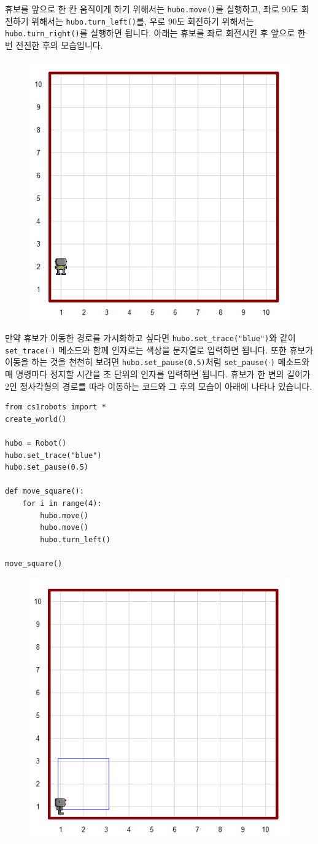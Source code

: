 \documentclass[../main.tex]{subfiles}
\begin{document}
휴보를 앞으로 한 칸 움직이게 하기 위해서는 \texttt{hubo.move()}를 실행하고, 좌로 90도 회전하기 위해서는 \texttt{hubo.turn\_left()}를, 우로 90도 회전하기 위해서는 \texttt{hubo.turn\_right()}를 실행하면 됩니다.
아래는 휴보를 좌로 회전시킨 후 앞으로 한 번 전진한 후의 모습입니다.
\begin{figure}[H]
\centering
\includegraphics[width=0.5\linewidth]{"./lectures/lecture4_huboleftmove"}
\label{fig:lecture4huboleftmove}
\end{figure}

만약 휴보가 이동한 경로를 가시화하고 싶다면 \texttt{hubo.set\_trace("blue")}와 같이 \texttt{set\_trace($\cdot$)} 메소드와 함께 인자로는 색상을 문자열로 입력하면 됩니다.
또한 휴보가 이동을 하는 것을 천천히 보려면 \texttt{hubo.set\_pause(0.5)}처럼 \texttt{set\_pause($\cdot$)} 메소드와 매 명령마다 정지할 시간을 초 단위의 인자를 입력하면 됩니다.
휴보가 한 변의 길이가 2인 정사각형의 경로를 따라 이동하는 코드와 그 후의 모습이 아래에 나타나 있습니다.
\begin{verbatim}
from cs1robots import *
create_world()

hubo = Robot()
hubo.set_trace("blue")
hubo.set_pause(0.5)

def move_square():
    for i in range(4):
        hubo.move()
        hubo.move()
        hubo.turn_left()

move_square()
\end{verbatim}
\begin{figure}[H]
\centering
\includegraphics[width=0.5\linewidth]{"./lectures/lecture4_hubosquare"}
\label{fig:lecture4hubosquare}
\end{figure}
\end{document}

